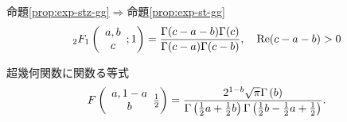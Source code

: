 \documentclass[pdf,notes]{beamer}
\renewcommand{\implies}{\Rightarrow}
\begin{document}
\begin{frame}[noframenumbering]{命題\ref{prop:exp-stz-gg}$\implies$命題\ref{prop:exp-st-gg}}
\begin{equation*}
		{}_2F_1\left( \begin{array}[]{c}
			a,b\\c
		\end{array};1\right)=\frac{\Gamma(c-a-b)\Gamma(c)}{\Gamma(c-a)\Gamma(c-b)},\quad \Re(c-a-b)>0
	\end{equation*}
\end{frame}
\begin{frame}[noframenumbering]{超幾何関数に関数る等式}
	\[F\left(\begin{array}[]{c}
		a,1-a\\b
	\end{array}\tfrac{1}{2}\right)=\frac{2^{1-b}\sqrt{\pi}\Gamma\left(b\right)%
}{\Gamma\left(\tfrac{1}{2}a+\tfrac{1}{2}b\right)\Gamma\left(\tfrac{1}{2}b-%
\tfrac{1}{2}a+\tfrac{1}{2}\right)}.\]
\end{frame}
\end{document}

